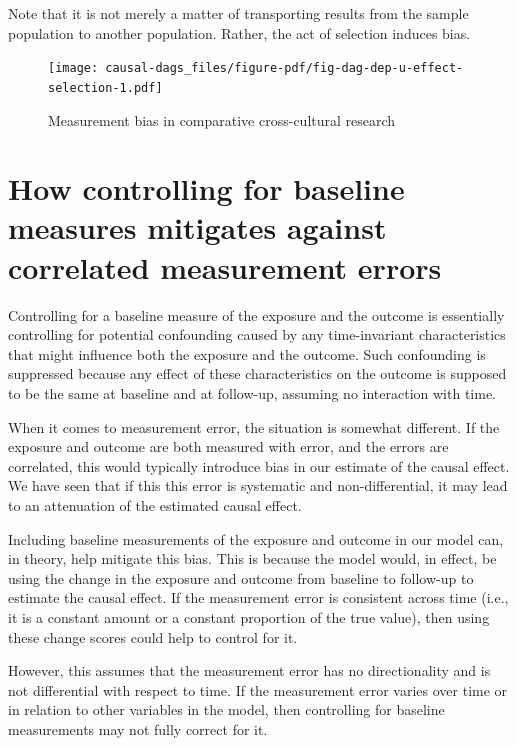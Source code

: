 \documentclass[
  singlecolumn]{report}
\begin{document}
Note that it is not merely a matter of transporting results from the
sample population to another population. Rather, the act of selection
induces bias.

\begin{figure}

{\centering \texttt{[image: causal-dags\_files/figure-pdf/fig-dag-dep-u-effect-selection-1.pdf]}

}

\caption{\label{fig-dag-dep-u-effect-selection}Measurement bias in
comparative cross-cultural research}

\end{figure}

\hypertarget{how-controlling-for-baseline-measures-mitigates-against-correlated-measurement-errors}{%
\section{How controlling for baseline measures mitigates against
correlated measurement
errors}\label{how-controlling-for-baseline-measures-mitigates-against-correlated-measurement-errors}}

Controlling for a baseline measure of the exposure and the outcome is
essentially controlling for potential confounding caused by any
time-invariant characteristics that might influence both the exposure
and the outcome. Such confounding is suppressed because any effect of
these characteristics on the outcome is supposed to be the same at
baseline and at follow-up, assuming no interaction with time.

When it comes to measurement error, the situation is somewhat different.
If the exposure and outcome are both measured with error, and the errors
are correlated, this would typically introduce bias in our estimate of
the causal effect. We have seen that if this this error is systematic
and non-differential, it may lead to an attenuation of the estimated
causal effect.

Including baseline measurements of the exposure and outcome in our model
can, in theory, help mitigate this bias. This is because the model
would, in effect, be using the change in the exposure and outcome from
baseline to follow-up to estimate the causal effect. If the measurement
error is consistent across time (i.e., it is a constant amount or a
constant proportion of the true value), then using these change scores
could help to control for it.

However, this assumes that the measurement error has no directionality
and is not differential with respect to time. If the measurement error
varies over time or in relation to other variables in the model, then
controlling for baseline measurements may not fully correct for it.
\end{document}
